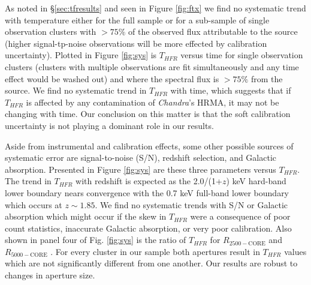 \documentclass{emulateapj}
\newcommand{\rtwf}{$R_{2500-\text{CORE}}$ }
\newcommand{\rfif}{$R_{5000-\text{CORE}}$ }
\begin{document}
As noted in \S\ref{sec:tfresults} and seen in Figure \ref{fig:ftx} we
find no systematic trend with temperature either for the full sample
or for a sub-sample of single observation clusters with $> 75\%$ of
the observed flux attributable to the source (higher signal-tp-noise
observations will be more effected by calibration uncertainty). Plotted in Figure
\ref{fig:sys} is $T_{HFR}$ versus time for single observation clusters
(clusters with multiple observations are fit simultaneously and any
time effect would be washed out) and where the spectral flux is $>
75\%$ from the source. We find no systematic trend in $T_{HFR}$
with time, which suggests that if $T_{HFR}$ is affected by any
contamination of {\it Chandra}'s HRMA, it may not be changing with
time. Our conclusion on this matter is that the soft calibration
uncertainty is not playing a dominant role in our results.


Aside from instrumental and calibration effects, some other possible
sources of systematic error are signal-to-noise (S/N), redshift
selection, and Galactic absorption. Presented in Figure \ref{fig:sys}
are these three parameters versus $T_{HFR}$. The trend in $T_{HFR}$ with redshift
is expected as the 2.0/(1+$z$) keV hard-band lower boundary nears
convergence with the 0.7 keV full-band lower boundary which occurs at
$z \sim 1.85$. We find no systematic trends with S/N or Galactic
absorption which might occur if the skew in $T_{HFR}$ were a consequence of
poor count statistics, inaccurate Galactic absorption, or very poor
calibration. Also shown in panel four of Fig. \ref{fig:sys} is the
ratio of $T_{HFR}$ for \rtwf and \rfif. For every cluster in our
sample both apertures result in $T_{HFR}$ values which are not significantly
different from one another. Our results are robust to changes in
aperture size.
\end{document}
